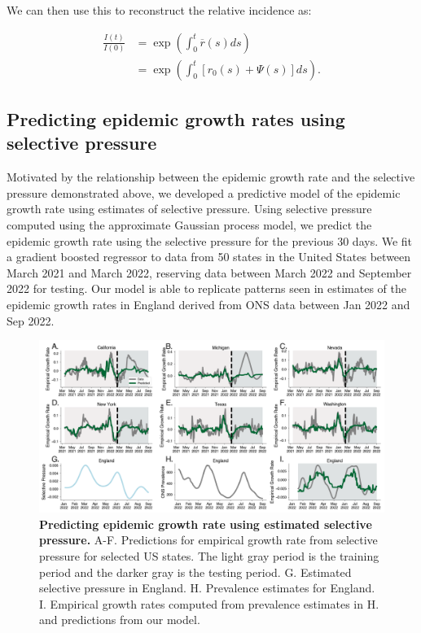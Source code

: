 \documentclass[11pt,oneside,letterpaper]{article}
\begin{document}
We can then use this to reconstruct the relative incidence as:

\begin{align*}
    \frac{I(t)}{I(0)} &= \exp\left(\int_{0}^{t} \overline{r}(s) ds\right)\\
         &= \exp \left(\int_{0}^{t} [r_{0}(s) + \Psi(s)]ds \right).
\end{align*}

\subsection*{Predicting epidemic growth rates using selective pressure}%

Motivated by the relationship between the epidemic growth rate and the selective pressure demonstrated above, we developed a predictive model of the epidemic growth rate using estimates of selective pressure.
Using selective pressure computed using the approximate Gaussian process model, we predict the epidemic growth rate using the selective pressure for the previous 30 days.
We fit a gradient boosted regressor to data from 50 states in the United States between March 2021 and March 2022, reserving data between March 2022 and September 2022 for testing.
Our model is able to replicate patterns seen in estimates of the epidemic growth rates in England derived from ONS data between Jan 2022 and Sep 2022.


\begin{figure}[h]
    \centering
    \includegraphics[width=0.8\linewidth]{./figures/selective_pressure_prediction.png}
    \caption{\textbf{Predicting epidemic growth rate using estimated selective pressure.}
    A-F. Predictions for empirical growth rate from selective pressure for selected US states.
    The light gray period is the training period and the darker gray is the testing period.
    G. Estimated selective pressure in England.
    H. Prevalence estimates for England.
    I. Empirical growth rates computed from prevalence estimates in H. and predictions from our model.
}
    \label{fig:selective_pressure_prediction}
\end{figure}
\end{document}

